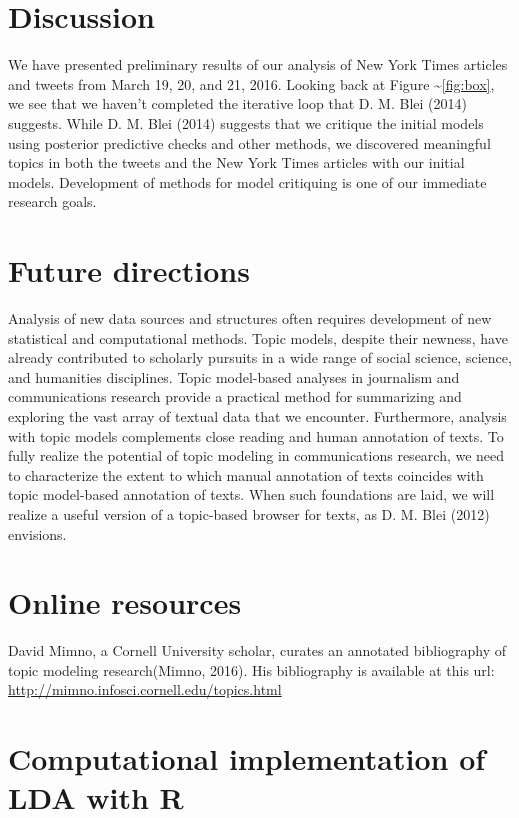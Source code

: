 \documentclass[12pt,]{article}
\begin{document}
\section{Discussion}\label{discussion}

We have presented preliminary results of our analysis of New York Times
articles and tweets from March 19, 20, and 21, 2016. Looking back at
Figure \textasciitilde{}\ref{fig:box}, we see that we haven't completed
the iterative loop that D. M. Blei (2014) suggests. While D. M. Blei
(2014) suggests that we critique the initial models using posterior
predictive checks and other methods, we discovered meaningful topics in
both the tweets and the New York Times articles with our initial models.
Development of methods for model critiquing is one of our immediate
research goals.

\section{Future directions}\label{future-directions}

Analysis of new data sources and structures often requires development
of new statistical and computational methods. Topic models, despite
their newness, have already contributed to scholarly pursuits in a wide
range of social science, science, and humanities disciplines. Topic
model-based analyses in journalism and communications research provide a
practical method for summarizing and exploring the vast array of textual
data that we encounter. Furthermore, analysis with topic models
complements close reading and human annotation of texts. To fully
realize the potential of topic modeling in communications research, we
need to characterize the extent to which manual annotation of texts
coincides with topic model-based annotation of texts. When such
foundations are laid, we will realize a useful version of a topic-based
browser for texts, as D. M. Blei (2012) envisions.

\section{Online resources}\label{online-resources}

David Mimno, a Cornell University scholar, curates an annotated
bibliography of topic modeling research(Mimno, 2016). His bibliography
is available at this url:
\url{http://mimno.infosci.cornell.edu/topics.html}

\section{Computational implementation of LDA with
R}\label{computational-implementation-of-lda-with-r}
\end{document}
